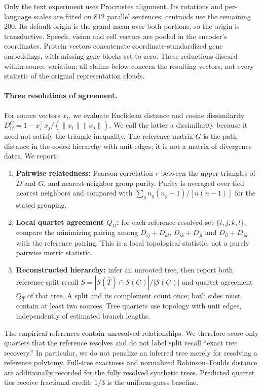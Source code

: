 \documentclass[mlmain]{jmlr}
\begin{document}
Only the text experiment uses Procrustes alignment. Its rotations and per-language scales are fitted
on 812 parallel sentences; centroids use the remaining 200. Its default origin is the grand mean
over both portions, so the origin is transductive. Speech, vision and cell vectors are pooled
in the encoder's coordinates. Protein vectors concatenate coordinate-standardized gene embeddings,
with missing gene blocks set to zero. These reductions discard within-source variation; all claims
below concern the resulting vectors, not every statistic of the original representation clouds.

\paragraph{Three resolutions of agreement.}
For source vectors $x_i$, we evaluate Euclidean distance and cosine dissimilarity
$D^C_{ij}=1-x_i^\top x_j/(\|x_i\|\|x_j\|)$. We call the latter a dissimilarity because it need not
satisfy the triangle inequality. The reference matrix $G$ is the path distance in the coded
hierarchy with unit edges; it is not a matrix of divergence dates. We report:

\begin{enumerate}\itemsep1pt
\item \textbf{Pairwise relatedness:} Pearson correlation $r$ between the upper triangles of $D$
and $G$, and nearest-neighbor group purity. Purity is averaged over tied nearest neighbors and
compared with $\sum_g n_g(n_g-1)/[n(n-1)]$ for the stated grouping.
\item \textbf{Local quartet agreement $Q_D$:} for each reference-resolved set $\{i,j,k,l\}$,
compare the minimizing pairing among
$D_{ij}+D_{kl}$, $D_{ik}+D_{jl}$ and $D_{il}+D_{jk}$ with the reference pairing.
This is a local topological statistic, not a purely pairwise metric statistic.
\item \textbf{Reconstructed hierarchy:} infer an unrooted tree, then report both reference-split
recall $S=|\mathcal S(\hat T)\cap\mathcal S(G)|/|\mathcal S(G)|$ and quartet agreement $Q_{\hat T}$
of that tree. A split and its complement count once; both sides must contain at least two sources.
Tree quartets use topology with unit edges, independently of estimated branch lengths.
\end{enumerate}

The empirical references contain unresolved relationships. We therefore score only quartets that
the reference resolves and do not label split recall ``exact tree recovery.'' In particular, we
do not penalize an inferred tree merely for resolving a reference polytomy. Full-tree exactness and
normalized Robinson--Foulds distance are additionally recorded for the fully resolved synthetic
trees. Predicted quartet ties receive fractional credit; $1/3$ is the uniform-guess baseline.
\end{document}
